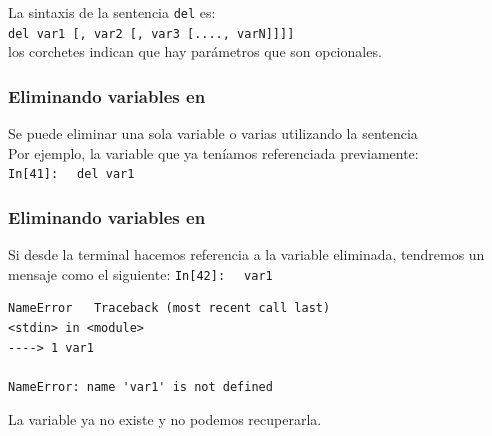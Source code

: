 \documentclass[12pt]{beamer}
\begin{document}
{\begin{frame}
La sintaxis de la sentencia \texttt{del} es:
\\
\bigskip
\texttt{del var1 [, var2 [, var3 [...., varN]]]]}
\\
\bigskip
los corchetes indican que hay parámetros que son opcionales.
\end{frame}
\begin{frame}[fragile]
\frametitle{Eliminando variables en \python}
Se puede eliminar una sola variable o varias utilizando la sentencia 
\\
\bigskip
Por ejemplo, la variable  que ya teníamos referenciada previamente:
\\
\bigskip
\textcolor{ao}{\texttt{In[41]: }} \verb| del var1|
\end{frame}
\begin{frame}[fragile]
\frametitle{Eliminando variables en }
Si desde la terminal hacemos referencia a la variable eliminada, tendremos un mensaje como el siguiente:
\textcolor{ao}{\texttt{In[42]: }} \verb| var1|
\begin{verbatim}
NameError   Traceback (most recent call last)
<stdin> in <module>
----> 1 var1

NameError: name 'var1' is not defined
\end{verbatim}
La variable ya no existe y no podemos recuperarla.
\end{frame}
}
\end{document}
